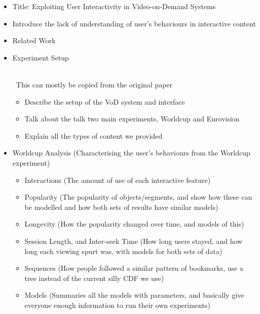 \documentclass[a4paper]{article}
\newcommand{\note}[1]{
    {~\\~\color{red}\sf #1 }
}
\begin{document}
\begin{itemize}

    \item Title: Exploiting User Interactivity in Video-on-Demand Systems

    \item Introduce the lack of understanding of user's behaviours in interactive content

    \item Related Work

    \item Experiment Setup
        \note{This can mostly be copied from the original paper}

        \begin{itemize}
            \item Describe the setup of the VoD system and interface

\cbstart
            \item Talk about the talk two main experiments, Worldcup and Eurovision
            \item Explain all the types of content we provided
\cbend
        \end{itemize}

    \item Worldcup Analysis (Characterising the user's behaviours from the Worldcup experiment)
        \begin{itemize}
            \item Interactions (The amount of use of each interactive feature)

            \item Popularity (The popularity of objects/segments, and show how these can be modelled and how both sets of results have similar models)

            \item Longevity (How the popularity changed over time, and models of this)

            \item Session Length, and Inter-seek Time (How long users stayed, and how long each viewing spurt was, with models for both sets of data)

            \item Sequences (How people followed a similar pattern of bookmarks, use a tree instead of the current silly CDF we use)

            \item Models (Summaries all the models with parameters, and basically give everyone enough information to run their own experiments)
        \end{itemize}


\end{itemize}
\end{document}
